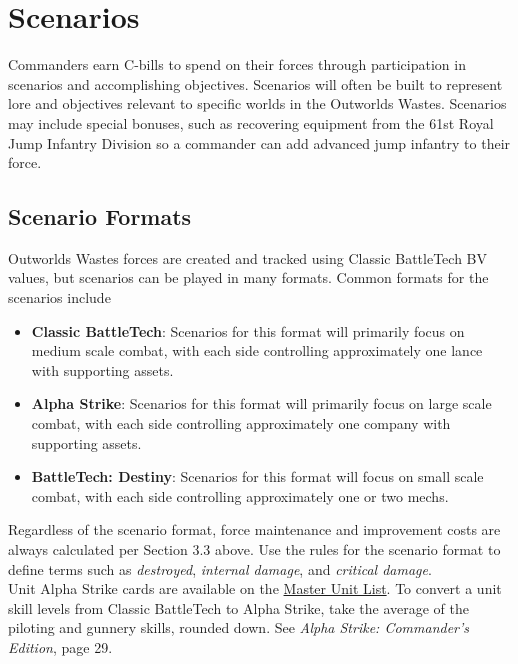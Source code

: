 \documentclass[UTF8]{article}
\begin{document}
\newpage

\section{Scenarios}

Commanders earn C-bills to spend on their forces through participation in scenarios and accomplishing objectives.
Scenarios will often be built to represent lore and objectives relevant to specific worlds in the Outworlds Wastes.
Scenarios may include special bonuses, such as recovering equipment from the 61st Royal Jump Infantry Division so a commander can add advanced jump infantry to their force.

\subsection{Scenario Formats}

Outworlds Wastes forces are created and tracked using Classic BattleTech BV values, but scenarios can be played in many formats.
Common formats for the scenarios include

\begin{itemize}

\item {\bf Classic BattleTech}: Scenarios for this format will primarily focus on medium scale combat, with each side controlling approximately one lance with supporting assets.

\item {\bf Alpha Strike}: Scenarios for this format will primarily focus on large scale combat, with each side controlling approximately one company with supporting assets.

\item {\bf BattleTech: Destiny}: Scenarios for this format will focus on small scale combat, with each side controlling approximately one or two mechs.

\end{itemize}

Regardless of the scenario format, force maintenance and improvement costs are always calculated per Section 3.3 above.
Use the rules for the scenario format to define terms such as \emph{destroyed}, \emph{internal damage}, and \emph{critical damage}.\\

Unit Alpha Strike cards are available on the \href{http://www.masterunitlist.info}{Master Unit List}.
To convert a unit skill levels from Classic BattleTech to Alpha Strike, take the average of the piloting and gunnery skills, rounded down.
See \emph{Alpha Strike: Commander's Edition}, page 29.\\
\end{document}
